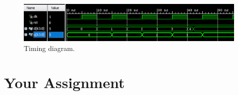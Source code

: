 \begin{figure}
\caption{Timing diagram.}\label{fig:registertiming}
\begin{center}
\includegraphics[width=4.75in]{../images/register_test_timing_diagram.png}
\end{center}
\end{figure}

\section{Your Assignment}

